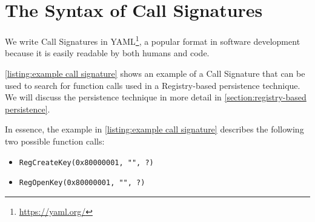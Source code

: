 \section{The Syntax of Call Signatures}\label{section:call signatures syntax}
We write Call Signatures in YAML\footnote{\tiny \url{https://yaml.org/}}, a popular format in software development because it is easily readable by both humans and code.

\autoref{listing:example call signature} shows an example of a Call Signature that can be used to search for function calls used in a Registry-based persistence technique. We will discuss the persistence technique in more detail in \autoref{section:registry-based persistence}.

In essence, the example in \autoref{listing:example call signature} describes the following two possible function calls:
\begin{itemize}
  \item \texttt{RegCreateKey(0x80000001, "", ?)}
  \item \texttt{RegOpenKey(0x80000001, "", ?)}
\end{itemize}


